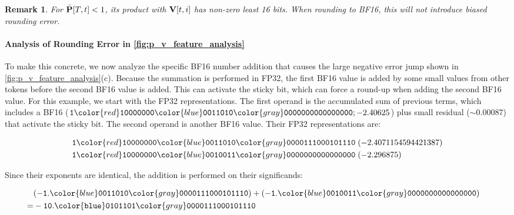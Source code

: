\documentclass{article} %
\newtheorem{remark}{Remark}
\begin{document}
\begin{remark}
  For $\bar{{\mathbf{P}}}[T, t] < 1$, its product with ${\mathbf{V}}[t, i]$ has non-zero least 16 bits. When rounding to BF16, this will not introduce biased rounding error.
\end{remark}

\paragraph{Analysis of Rounding Error in \cref{fig:p_v_feature_analysis}}
To make this concrete, we now analyze the specific BF16 number addition that causes the large negative error jump shown in \cref{fig:p_v_feature_analysis}(c). Because the summation is performed in FP32, the first BF16 value is added by some small values from other tokens before the second BF16 value is added. This can activate the sticky bit, which can force a round-up when adding the second BF16 value.
For this example, we start with the FP32 representations.
The first operand is the accumulated sum of previous terms, which includes a BF16  ($\mathtt{1}{{\color{red}\mathtt{10000000}}}{{\color{blue}\mathtt{0011010}}}{\color{gray}\mathtt{0000000000000000}}; -2.40625$) plus small residual ($\sim 0.00087$) that activate the sticky bit. The second operand is another BF16 value. Their FP32 representations are:
\begin{tcolorbox}[colback=black!5!white,      
  colframe=black,             
  boxrule=0.5pt,             
  width=0.95\linewidth,       
  arc=4pt,                     
  boxsep=1pt,                  
  halign=center,              
  top=0pt,
  bottom=0.5pt,
  center]
\vspace{-5px}
\begin{align*}
  \mathtt{1}{\color{red}\mathtt{10000000}}{\color{blue}\mathtt{0011010}}{\color{gray}\mathtt{0000111000101110}} &\; (-2.4071154594421387) \\
  \mathtt{1}{{\color{red}\mathtt{10000000}}}{{\color{blue}\mathtt{0010011}}}{\color{gray}\mathtt{0000000000000000}}&\; (-2.296875)
\end{align*}
\end{tcolorbox}
Since their exponents are identical, the addition is performed on their significands:
\begin{tcolorbox}[colback=black!5!white,      
  colframe=black,             
  boxrule=0.5pt,             
  width=0.95\linewidth,       
  arc=4pt,                     
  boxsep=1pt,                  
  halign=center,              
  top=0pt,
  bottom=0.5pt,
  center]
\vspace{-4px}
\begin{align*}
  &(\mathtt{-1.}{\color{blue}\mathtt{0011010}}{\color{gray}\mathtt{0000111000101110}})
  + (\mathtt{-1.}{\color{blue}\mathtt{0010011}}{\color{gray}\mathtt{0000000000000000}})& \\
  =& -\mathtt{10.{\color{blue}0101101}}{\color{gray}\mathtt{0000111000101110}}
\end{align*}
\end{tcolorbox}
\end{document}
